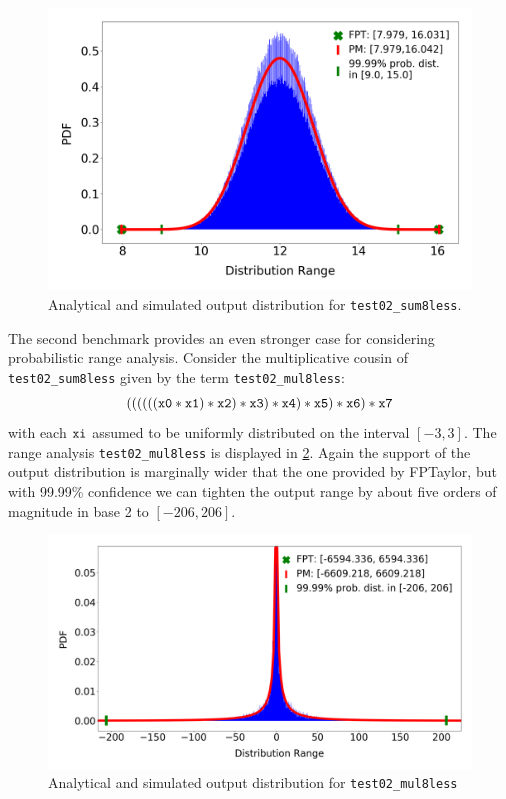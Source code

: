 \documentclass[10pt,conference]{IEEEtran}
\begin{document}
\begin{figure}[h!]
	\includegraphics[scale=0.22]{pics/range_dist}
	\caption{Analytical and simulated output distribution for \texttt{test02\_sum8less}.}
	\label{fig:impl:benchmark}
\end{figure}

The second benchmark provides an even stronger case for considering probabilistic range analysis. Consider the multiplicative cousin of \texttt{test02\_sum8less} given by the term \texttt{test02\_mul8less}:
\[
\tt{((((((x0 * x1) * x2) * x3) * x4) * x5) * x6) * x7}
\]
with each $\tt xi$ assumed to be uniformly distributed on the interval $\left[-3,3\right]$. The range analysis \texttt{test02\_mul8less} is displayed in \cref{fig:impl:benchmark2}. Again the support of the output distribution is marginally wider that the one provided by FPTaylor, but with 99.99\% confidence we can tighten the output range by about five orders of magnitude in base 2 to $\left[-206,206\right]$.
\begin{figure}[h!]
	\includegraphics[scale=0.177]{pics/mul}
	\caption{Analytical and simulated output distribution for \texttt{test02\_mul8less}}
	\label{fig:impl:benchmark2}
\end{figure}





\end{document}
